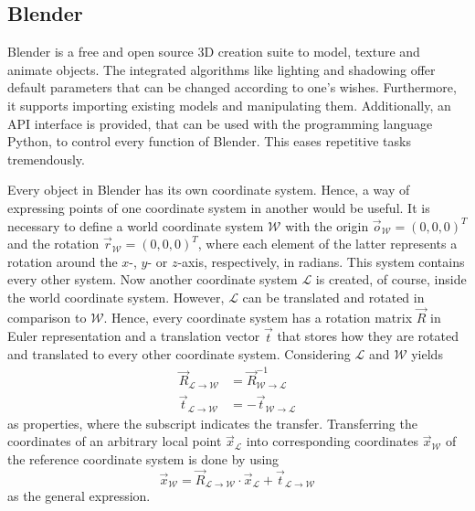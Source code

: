 \subsection{Blender}
\label{sec:software-blender}
Blender is a free and open source 3D creation suite to model, texture and animate objects.
The integrated algorithms like lighting and shadowing offer default parameters that can be changed according to one's wishes.
Furthermore, it supports importing existing models and manipulating them.
Additionally, an API interface is provided, that can be used with the programming language Python, to control every function of Blender.
This eases repetitive tasks tremendously.

Every object in Blender has its own coordinate system.
Hence, a way of expressing points of one coordinate system in another would be useful.
It is necessary to define a world coordinate system $\mathcal{W}$ with the origin $\vec{o}_\mathcal{W} = (0,0,0)^T$ and the rotation $\vec{r}_{\mathcal{W}} = (0,0,0)^T$, where each element of the latter represents a rotation around the $x$-, $y$- or $z$-axis, respectively, in radians.
This system contains every other system.
Now another coordinate system $\mathcal{L}$ is created, of course, inside the world coordinate system.
However, $\mathcal{L}$ can be translated and rotated in comparison to $\mathcal{W}$.
Hence, every coordinate system has a rotation matrix $\vec{R}$ in Euler representation and a translation vector $\vec{t}$ that stores how they are rotated and translated to every other coordinate system.
Considering $\mathcal{L}$ and $\mathcal{W}$ yields
\begin{align}
	\vec{R}_{\mathcal{L} \rightarrow \mathcal{W}} &= \vec{R}_{\mathcal{W} \rightarrow \mathcal{L}}^{-1} \\
	\vec{t}_{\mathcal{L} \rightarrow \mathcal{W}} &= - \vec{t}_{\mathcal{W} \rightarrow \mathcal{L}}
\end{align}
as properties, where the subscript indicates the transfer.
Transferring the coordinates of an arbitrary local point $\vec{x}_{\mathcal{L}}$ into corresponding coordinates $\vec{x}_{\mathcal{W}}$ of the reference coordinate system is done by using
\begin{equation}
	\vec{x}_{\mathcal{W}} = \vec{R}_{\mathcal{L} \rightarrow \mathcal{W}} \cdot \vec{x}_{\mathcal{L}} + \vec{t}_{\mathcal{L} \rightarrow \mathcal{W}}
\end{equation}
as the general expression.